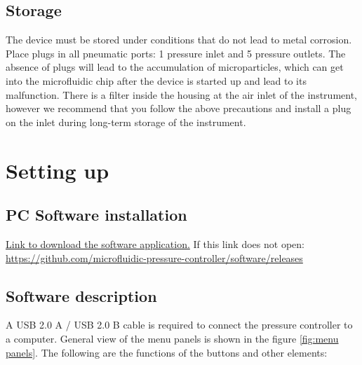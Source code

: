 \documentclass[twoside, 12pt, a4paper]{refart}
\begin{document}
  \subsection{Storage}
    The device must be stored under conditions that do not lead to metal corrosion. Place plugs in all pneumatic ports: 1 pressure inlet and 5 pressure outlets. The absence of plugs will lead to the accumulation of microparticles, which can get into the microfluidic chip after the device is started up and lead to its malfunction. There is a filter inside the housing at the air inlet of the instrument, however we recommend that you follow the above precautions and install a plug on the inlet during long-term storage of the instrument.
    
  \newpage
  \section{Setting up}
  \label{setup}
  
  \subsection{PC Software installation}
    \href{https://github.com/microfluidic-pressure-controller/software/releases}{Link to download the software application.}
    \newline If this link does not open:\\
    \url {https://github.com/microfluidic-pressure-controller/software/releases}
    
  \subsection{Software description}
    A USB 2.0 A / USB 2.0 B cable is required to connect the pressure controller to a computer.
    \newline General view of the menu panels is shown in the figure \ref{fig:menu panels}.
The following are the functions of the buttons and other elements:
      
\end{document}
